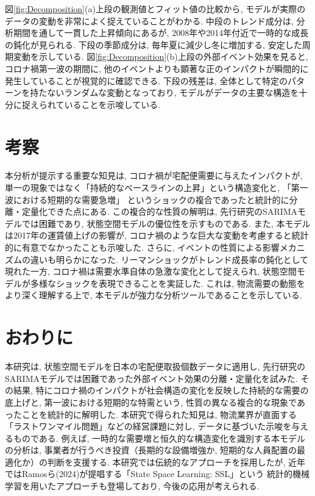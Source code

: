 \documentclass[a4paper, 10pt]{jarticle}
\begin{document}
図\ref{fig:Decomposition}(a)上段の観測値とフィット値の比較から, モデルが実際のデータの変動を非常によく捉えていることがわかる. 
中段のトレンド成分は, 分析期間を通して一貫した上昇傾向にあるが, 2008年や2014年付近で一時的な成長の鈍化が見られる. 
下段の季節成分は, 毎年夏に減少し冬に増加する, 安定した周期変動を示している. 
図\ref{fig:Decomposition}(b)上段の外部イベント効果を見ると, コロナ禍第一波の期間に, 他のイベントよりも顕著な正のインパクトが瞬間的に発生していることが視覚的に確認できる. 
下段の残差は, 全体として特定のパターンを持たないランダムな変動となっており, モデルがデータの主要な構造を十分に捉えられていることを示唆している. 



\section{考察}
本分析が提示する重要な知見は, コロナ禍が宅配便需要に与えたインパクトが, 
単一の現象ではなく「持続的なベースラインの上昇」という構造変化と, 「第一波における短期的な需要急増」
というショックの複合であったと統計的に分離・定量化できた点にある. この複合的な性質の解明は, 
先行研究のSARIMAモデルでは困難であり, 状態空間モデルの優位性を示すものである. 
また, 本モデルは2017年の運賃値上げの影響が, コロナ禍のような巨大な変動を考慮すると統計的に有意でなかったことも示唆した. 
さらに, イベントの性質による影響メカニズムの違いも明らかになった. リーマンショックがトレンド成長率の鈍化として現れた一方, 
コロナ禍は需要水準自体の急激な変化として捉えられ, 状態空間モデルが多様なショックを表現できることを実証した. これは, 
物流需要の動態をより深く理解する上で, 本モデルが強力な分析ツールであることを示している. 

\section{おわりに}
本研究は, 状態空間モデルを日本の宅配便取扱個数データに適用し, 先行研究のSARIMAモデルでは困難であった外部イベント効果の分離・定量化を試みた. 
その結果, 特にコロナ禍のインパクトが社会構造の変化を反映した持続的な需要の底上げと, 
第一波における短期的な特需という, 性質の異なる複合的な現象であったことを統計的に解明した. 
本研究で得られた知見は, 物流業界が直面する「ラストワンマイル問題」などの経営課題に対し, データに基づいた示唆を与えるものである. 
例えば, 一時的な需要増と恒久的な構造変化を識別する本モデルの分析は, 
事業者が行うべき投資（長期的な設備増強か, 短期的な人員配置の最適化か）の判断を支援する. 
本研究では伝統的なアプローチを採用したが, 
近年ではRamosら(2024)が提唱する「State Space Learning: SSL」という
統計的機械学習を用いたアプローチも登場しており, 今後の応用が考えられる.  
\end{document}
